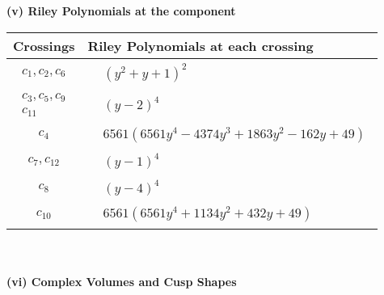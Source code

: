 \documentclass[1p]{elsarticle_modified}
\theoremstyle{definition}
\begin{document}
\newpage\renewcommand{\arraystretch}{1}
\flushleft \textbf{(v) Riley Polynomials at the component}\newline \\
\begin{tabular}{m{50pt}|m{274pt}}
Crossings & \hspace{64pt}Riley Polynomials at each crossing \\
\hline $$\begin{aligned}c_{1},c_{2},c_{6}\end{aligned}$$&$\begin{aligned}
&(y^2+y+1)^2
\end{aligned}$\\
\hline $$\begin{aligned}c_{3},c_{5},c_{9}\\c_{11}\end{aligned}$$&$\begin{aligned}
&(y-2)^4
\end{aligned}$\\
\hline $$\begin{aligned}c_{4}\end{aligned}$$&$\begin{aligned}
&6561(6561 y^4-4374 y^3+1863 y^2-162 y+49)
\end{aligned}$\\
\hline $$\begin{aligned}c_{7},c_{12}\end{aligned}$$&$\begin{aligned}
&(y-1)^4
\end{aligned}$\\
\hline $$\begin{aligned}c_{8}\end{aligned}$$&$\begin{aligned}
&(y-4)^4
\end{aligned}$\\
\hline $$\begin{aligned}c_{10}\end{aligned}$$&$\begin{aligned}
&6561(6561 y^4+1134 y^2+432 y+49)
\end{aligned}$\\
\hline
\end{tabular}\\~\\
\newpage\flushleft \textbf{(vi) Complex Volumes and Cusp Shapes}
\end{document}
